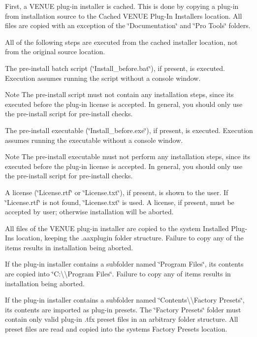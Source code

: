 \begin{DoxyEnumerate}
\item First, a V\+E\+N\+U\+E plug-\/in installer is cached. This is done by copying a plug-\/in from installation source to the Cached V\+E\+N\+U\+E Plug-\/\+In Installers location. All files are copied with an exception of the \char`\"{}\+Documentation\char`\"{} and \char`\"{}\+Pro Tools\char`\"{} folders.

All of the following steps are executed from the cached installer location, not from the original source location.  
\item The pre-\/install batch script (\char`\"{}\+Install\+\_\+before.\+bat\char`\"{}), if present, is executed. Execution assumes running the script without a console window.

\begin{DoxyNote}{Note}
The pre-\/install script must not contain any installation steps, since it\textquotesingle{}s executed before the plug-\/in license is accepted. In general, you should only use the pre-\/install script for pre-\/install checks.  
\end{DoxyNote}

\item The pre-\/install executable (\char`\"{}\+Install\+\_\+before.\+exe\char`\"{}), if present, is executed. Execution assumes running the executable without a console window.

\begin{DoxyNote}{Note}
The pre-\/install executable must not perform any installation steps, since it\textquotesingle{}s executed before the plug-\/in license is accepted. In general, you should only use the pre-\/install script for pre-\/install checks.  
\end{DoxyNote}

\item A license (\char`\"{}\+License.\+rtf\char`\"{} or \char`\"{}\+License.\+txt\char`\"{}), if present, is shown to the user. If \char`\"{}\+License.\+rtf\char`\"{} is not found, \char`\"{}\+License.\+txt\char`\"{} is used. A license, if present, must be accepted by user; otherwise installation will be aborted.  
\item All files of the V\+E\+N\+U\+E plug-\/in installer are copied to the system Installed Plug-\/\+Ins location, keeping the .aaxplugin folder structure. Failure to copy any of the items results in installation being aborted.  
\item If the plug-\/in installer contains a subfolder named \char`\"{}\+Program Files\char`\"{}, its contents are copied into \char`\"{}\+C\+:\textbackslash{}\textbackslash{}\+Program Files\char`\"{}. Failure to copy any of items results in installation being aborted.  
\item If the plug-\/in installer contains a subfolder named \char`\"{}\+Contents\textbackslash{}\textbackslash{}\+Factory Presets\char`\"{}, its contents are imported as plug-\/in presets. The \char`\"{}\+Factory Presets\char`\"{} folder must contain only valid plug-\/in .tfx preset files in an arbitrary folder structure. All preset files are read and copied into the system\textquotesingle{}s Factory Presets location.


\end{DoxyEnumerate}
